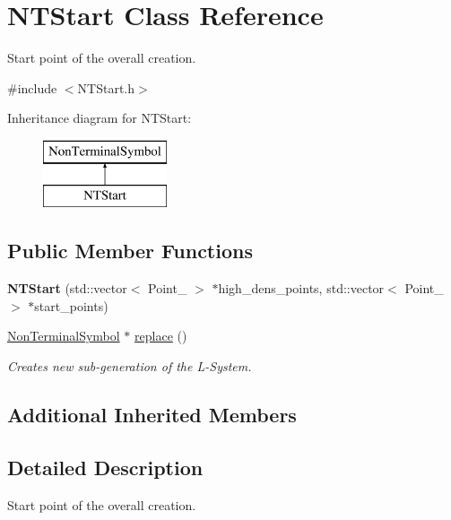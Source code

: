 \hypertarget{class_n_t_start}{}\section{N\+T\+Start Class Reference}
\label{class_n_t_start}


Start point of the overall creation.  




{\ttfamily \#include $<$N\+T\+Start.\+h$>$}

Inheritance diagram for N\+T\+Start\+:\begin{figure}[H]
\begin{center}
\leavevmode
\includegraphics[height=2.000000cm]{class_n_t_start}
\end{center}
\end{figure}
\subsection*{Public Member Functions}
\begin{DoxyCompactItemize}
\item 
\hypertarget{class_n_t_start_a6b76194e7dddaea8bea60781cd288a7e}{}\label{class_n_t_start_a6b76194e7dddaea8bea60781cd288a7e} 
{\bfseries N\+T\+Start} (std\+::vector$<$ Point\+\_ $>$ $\ast$high\+\_\+dens\+\_\+points, std\+::vector$<$ Point\+\_ $>$ $\ast$start\+\_\+points)
\item 
\hyperlink{class_non_terminal_symbol}{Non\+Terminal\+Symbol} $\ast$ \hyperlink{class_n_t_start_a3f9897b293a26b301415a9089b90697b}{replace} ()
\begin{DoxyCompactList}\small\item\em Creates new sub-\/generation of the L-\/\+System. \end{DoxyCompactList}\end{DoxyCompactItemize}
\subsection*{Additional Inherited Members}


\subsection{Detailed Description}
Start point of the overall creation. 

